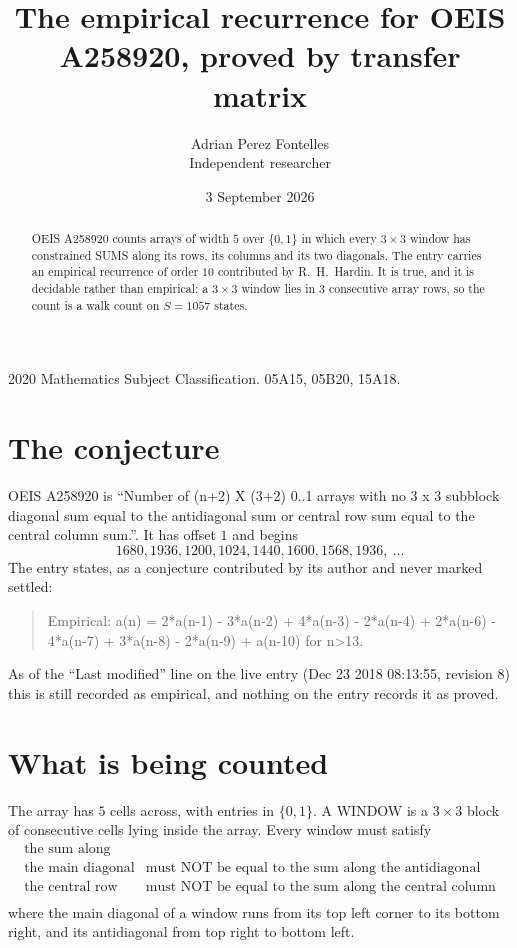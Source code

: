 \documentclass[11pt,a4paper]{article}
\title{The empirical recurrence for OEIS A258920, proved by transfer matrix}
\author{Adrian Perez Fontelles\\ \small Independent researcher}
\date{3 September 2026}
\theoremstyle{plain}
\theoremstyle{definition}
\begin{document}
\maketitle

\begin{abstract}
OEIS A258920 counts arrays of width $5$ over $\{0,1\}$ in which every $3\times3$ window has
constrained SUMS along its rows, its columns and its two diagonals. The entry carries an
empirical recurrence of order $10$ contributed by R.~H.~Hardin. It is true, and it is
decidable rather than empirical: a $3\times3$ window lies in $3$ consecutive array rows,
so the count is a walk count on $S=1057$ states.
\end{abstract}

\noindent\small 2020 Mathematics Subject Classification. 05A15, 05B20, 15A18.\normalsize

\section{The conjecture}

OEIS A258920 is ``Number of (n+2) X (3+2) 0..1 arrays with no 3 x 3 subblock diagonal sum equal to the antidiagonal sum or central row sum equal to the central column sum.''. It has offset $1$ and begins
\[
1680, 1936, 1200, 1024, 1440, 1600, 1568, 1936,\ \dots
\]
The entry states, as a conjecture contributed by its author and never marked settled:
\begin{quote}
Empirical: a(n) = 2*a(n-1) - 3*a(n-2) + 4*a(n-3) - 2*a(n-4) + 2*a(n-6) - 4*a(n-7) + 3*a(n-8) - 2*a(n-9) + a(n-10) for n>13.
\end{quote}
As of the ``Last modified'' line on the live entry (Dec 23 2018 08:13:55, revision 8) this is still
recorded as empirical, and nothing on the entry records it as proved.

\section{What is being counted}

The array has $5$ cells across, with entries in $\{0,1\}$. A WINDOW is a $3\times3$ block
of consecutive cells lying inside the array. Every window must satisfy
\[
\begin{array}{ll}
\text{the sum along} & \text{} \\[2pt]
\text{the main diagonal} & \text{must NOT be equal to the sum along the antidiagonal} \\
\text{the central row} & \text{must NOT be equal to the sum along the central column} \\
\end{array}
\]
where the main diagonal of a window runs from its top left corner to its bottom right, and its
antidiagonal from top right to bottom left.
\end{document}

